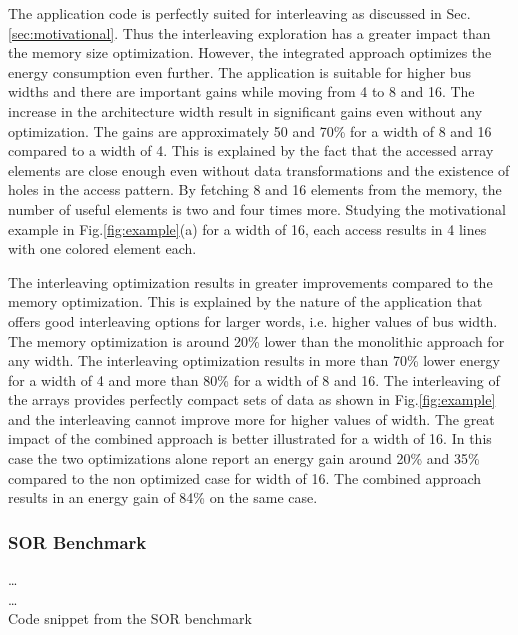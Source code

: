 \documentclass[prodmode,acmtecs]{acmsmall}
\begin{document}
The application code is perfectly suited for interleaving as discussed in Sec.\ref{sec:motivational}.
Thus the interleaving exploration has a greater impact than the memory size optimization.
However, the integrated approach optimizes the energy consumption even further.
The application is suitable for higher bus widths and there are important gains while moving from 4 to 8 and 16.
The increase in the architecture width result in significant gains even without any optimization.
The gains are approximately 50 and 70\% for a width of 8 and 16 compared to a width of 4.
This is explained by the fact that the accessed array elements are close enough even without data transformations and the existence of holes in the access pattern. 
By fetching 8 and 16 elements from the memory, the number of useful elements is two and four times more.
Studying the motivational example in Fig.\ref{fig:example}(a) for a width of 16, each access results in 4 lines with one colored element each.

The interleaving optimization results in greater improvements compared to the memory optimization.
This is explained by the nature of the application that offers good interleaving options for larger words, i.e. higher values of bus width.
The memory optimization is around 20\% lower than the monolithic approach for any width.
The interleaving optimization results in more than 70\% lower energy for a width of 4 and more than 80\% for a width of 8 and 16.
The interleaving of the arrays provides perfectly compact sets of data as shown in Fig.\ref{fig:example} and the interleaving cannot improve more for higher values of width.
The great impact of the combined approach is better illustrated for a width of 16. 
In this case the two optimizations alone report an energy gain around 20\% and 35\% compared to the non optimized case for width of 16.
The combined approach results in an energy gain of 84\% on the same case.

\subsubsection{SOR Benchmark}

\begin{algorithm}[t]
\SetAlgoNoLine
\ldots \\
{}	
 \ldots \\		
\caption{Code snippet from the SOR benchmark}
\label{alg:sor}
\end{algorithm}
\end{document}
